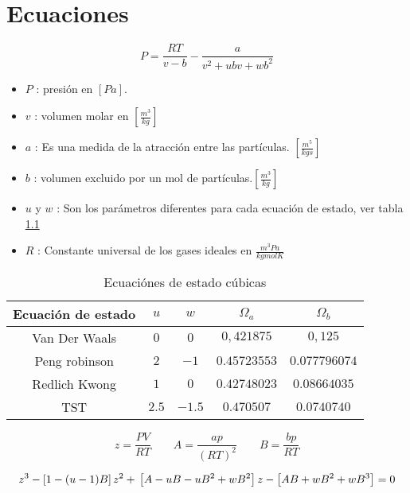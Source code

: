 \chapter{Ecuaciones}



\begin{equation}
P = \frac{R T}{v-b} - \frac{a}{v^2 +u b v + w b^2 }
\end{equation}


\begin{itemize}\itemsep0ex
\item $P$ : presión en $[Pa]$.
\item $v$ : volumen molar en $[\frac{m^3}{kg}]$
\item $a$ : Es una medida de la atracción entre las partículas. $[\frac{m^5}{kg s}]$
\item $b$ : volumen excluido por un mol de partículas.$[\frac{m^3}{kg}]$
\item $u$ y $w$ : Son los parámetros diferentes para cada ecuación de estado, ver tabla \ref{tab:cubics}
\item $R$ : Constante universal de los gases ideales en $\frac{m^3 Pa}{kgmol K}$
\end{itemize}

	\begin{table}
	
	\begin{tabular}{|c |c | c | c | c |}
		\hline
		Ecuación de estado  & $u$ & $w$ & $\Omega_a$&$\Omega_b$\\
		\hline
		Van Der Waals  & $0$ & $0$ & $0,421875$ & $0,125$\\
		\hline
		Peng robinson  & $2$ & $-1$ & $0.45723553$ & $0.077796074$\\
		\hline
		Redlich Kwong  & $1$ & $0$ & $0.42748023$ & $0.08664035$\\
		\hline
		TST  & $2.5$ & $-1.5$ &$ 0.470507$ & $0.0740740$\\
		\hline
	\end{tabular}
	\caption{Ecuaciónes de estado cúbicas}\label{tab:cubics}
	\end{table}





\begin{equation}
z= \frac{P V}{R T}
\qquad
A=\frac{ap}{(RT)^2}
\qquad
B=\frac{bp}{RT}
\end{equation}

\begin{equation}
z^3-\left[1-(u-1)B\right]z^2+ \\ \left[A-uB-uB^2 +\\ wB^2\right]z-\left[AB+wB^2+wB^3\right]=0
\end{equation}


